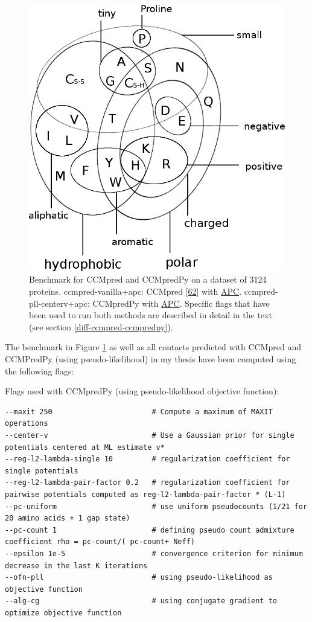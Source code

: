 \documentclass[12pt,a4paper,twoside]{book}
\theoremstyle{definition}
\theoremstyle{definition}
\theoremstyle{remark}
\begin{document}
\begin{figure}
\includegraphics[width=1\linewidth]{img/amino_acid_physico_chemical_properties_venn_diagramm} \caption{Benchmark for CCMpred and
CCMpredPy on a dataset of 3124 proteins. ccmpred-vanilla+apc: CCMpred
{[}\protect\hyperlink{ref-Seemayer2014}{62}{]} with
\protect\hyperlink{abbrev}{APC}. ccmpred-pll-centerv+apc: CCMpredPy with
\protect\hyperlink{abbrev}{APC}. Specific flags that have been used to
run both methods are described in detail in the text (see section
\ref{diff-ccmpred-ccmpredpy}).}\label{fig:cmmpredvanilla-vs-ccmpredpy}
\end{figure}

The benchmark in Figure \ref{fig:cmmpredvanilla-vs-ccmpredpy} as well as
all contacts predicted with CCMpred and CCMPredPy (using
pseudo-likelihood) in my thesis have been computed using the following
flags:

Flags used with CCMpredPy (using pseudo-likelihood objective function):

\begin{verbatim}
--maxit 250                       # Compute a maximum of MAXIT operations
--center-v                        # Use a Gaussian prior for single potentials centered at ML estimate v*
--reg-l2-lambda-single 10         # regularization coefficient for single potentials
--reg-l2-lambda-pair-factor 0.2   # regularization coefficient for pairwise potentials computed as reg-l2-lambda-pair-factor * (L-1)
--pc-uniform                      # use uniform pseudocounts (1/21 for 20 amino acids + 1 gap state) 
--pc-count 1                      # defining pseudo count admixture coefficient rho = pc-count/( pc-count+ Neff)
--epsilon 1e-5                    # convergence criterion for minimum decrease in the last K iterations
--ofn-pll                         # using pseudo-likelihood as objective function
--alg-cg                          # using conjugate gradient to optimize objective function
\end{verbatim}
\end{document}
